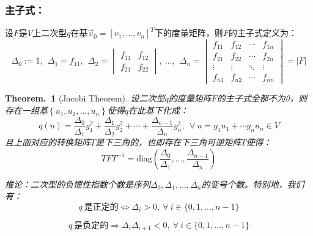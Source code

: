\documentclass[zihao=-4,UTF8]{report}
\theoremstyle{mystyle} %
\newtheorem{theorem}{Theorem.\,}
\begin{document}
\subsubsection{主子式：}
设$F$是$V$上二次型$q$在基$\vec{v}_0 = \left[v_1,...,v_n\right]^T$下的度量矩阵，则$F$的主子式定义为：
\begin{equation*}
    \Delta_0 := 1,\ \   \Delta_1 = f_{11},\ \  
    \Delta_2 =\begin{vmatrix}
        f_{11} & f_{12}\\
        f_{21} & f_{22 }
    \end{vmatrix} ,\ \dots ,\ \ 
    \Delta_n = 
    \begin{vmatrix}  
        f_{11}& f_{12}& \cdots  & f_{1n} \\  
        f_{21}& f_{22}& \cdots  & f_{2n} \\  
        \vdots & \vdots & \ddots & \vdots \\  
        f_{n1}& f_{n2}& \cdots  & f_{nn}  
      \end{vmatrix}  
    = \left | F \right |       
\end{equation*}
\begin{theorem}[Jacobi Theorem]
    设二次型$q$的度量矩阵$F$的主子式全都不为0，则存在一组基$\left\{u_1,u_2,...,u_n\right\}$使得$q$在此基下化成：
    \begin{equation*}
        q(u) = \frac{\Delta_0}{\Delta_1}y_1^2 + \frac{\Delta_1}{\Delta_2}y_2^2+ \cdots +\frac{\Delta_{n-1}}{\Delta_n}y_n^2,\  \ \forall \ u = y_1u_1 + \cdots y_nu_n \in V
    \end{equation*}
    且上面对应的转换矩阵$T$是下三角的，也即存在下三角可逆矩阵$T$使得：
    \begin{equation*}
        TFT^{-1} = \text{diag}(\frac{\Delta_0}{\Delta_1},...,\frac{\Delta_{n-1}}{\Delta_n} )
    \end{equation*}\par
    推论：二次型的负惯性指数个数是序列$\Delta_0,\Delta_1,\dots,\Delta_n$的变号个数。特别地，我们有：
    \begin{equation*}
        q \ \text{是正定的}\Longleftrightarrow \Delta_i >0,\ \forall\  i \in \{0,1,...,n-1\}
    \end{equation*}
{\par\color{gray}\small
\begin{equation*}
    q \ \text{是负定的}\Longrightarrow \Delta_i\Delta_{i+1}<0,\ \forall\  i \in \{0,1,...,n-1\}
\end{equation*}
\par}

\end{theorem}
\end{document}
